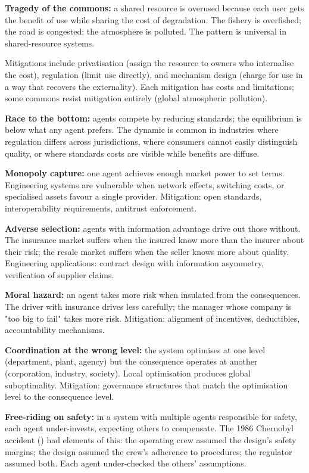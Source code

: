 \textbf{Tragedy of the commons:} a shared resource is overused because each user gets the benefit of use while sharing the cost of degradation. The fishery is overfished; the road is congested; the atmosphere is polluted. The pattern is universal in shared-resource systems.

Mitigations include privatisation (assign the resource to owners who internalise the cost), regulation (limit use directly), and mechanism design (charge for use in a way that recovers the externality). Each mitigation has costs and limitations; some commons resist mitigation entirely (global atmospheric pollution).

\textbf{Race to the bottom:} agents compete by reducing standards; the equilibrium is below what any agent prefers. The dynamic is common in industries where regulation differs across jurisdictions, where consumers cannot easily distinguish quality, or where standards costs are visible while benefits are diffuse.

\textbf{Monopoly capture:} one agent achieves enough market power to set terms. Engineering systems are vulnerable when network effects, switching costs, or specialised assets favour a single provider. Mitigation: open standards, interoperability requirements, antitrust enforcement.

\textbf{Adverse selection:} agents with information advantage drive out those without. The insurance market suffers when the insured know more than the insurer about their risk; the resale market suffers when the seller knows more about quality. Engineering applications: contract design with information asymmetry, verification of supplier claims.

\textbf{Moral hazard:} an agent takes more risk when insulated from the consequences. The driver with insurance drives less carefully; the manager whose company is "too big to fail" takes more risk. Mitigation: alignment of incentives, deductibles, accountability mechanisms.

\textbf{Coordination at the wrong level:} the system optimises at one level (department, plant, agency) but the consequence operates at another (corporation, industry, society). Local optimisation produces global suboptimality. Mitigation: governance structures that match the optimisation level to the consequence level.

\textbf{Free-riding on safety:} in a system with multiple agents responsible for safety, each agent under-invests, expecting others to compensate. The 1986 Chernobyl accident (\cite{acc:iaea-insag7-1992}) had elements of this: the operating crew assumed the design's safety margins; the design assumed the crew's adherence to procedures; the regulator assumed both. Each agent under-checked the others' assumptions.

